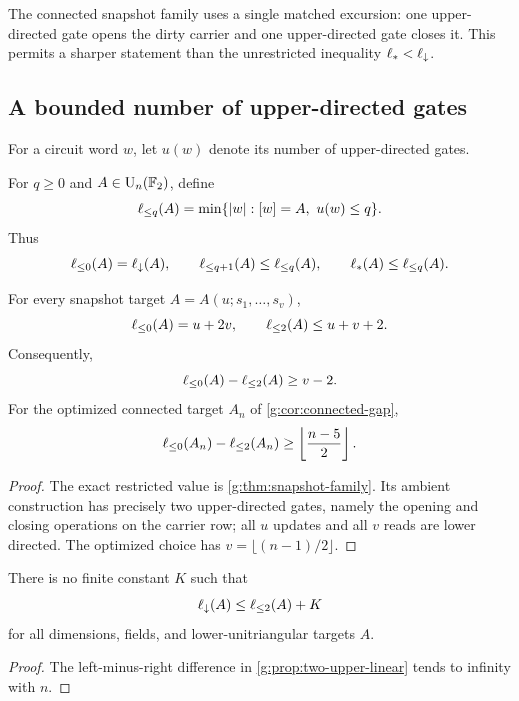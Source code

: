 The connected snapshot family uses a single matched excursion: one upper-directed gate opens the dirty carrier and one upper-directed gate closes it.  This permits a sharper statement than the unrestricted inequality $\ell_{*}<\ell_{\downarrow}$.

\subsection{A bounded number of upper-directed gates}

For a circuit word $w$, let $u(w)$ denote its number of upper-directed gates.

\begin{definition}
For $q\ge0$ and $A\in\operatorname{U}_n(\mathbb F_2)$, define
\[
\ell_{\le q}(A)
=
\min\{|w|:[w]=A,\ u(w)\le q\}.
\]
Thus
\[
\ell_{\le 0}(A)=\ell_{\downarrow}(A),
\qquad
\ell_{\le q+1}(A)\le\ell_{\le q}(A),
\qquad
\ell_{*}(A)\le\ell_{\le q}(A).
\]
\end{definition}

\begin{proposition}\label{g:prop:two-upper-linear}
For every snapshot target $A=A(u;s_1,\ldots,s_v)$,
\[
\ell_{\le 0}(A)=u+2v,
\qquad
\ell_{\le 2}(A)\le u+v+2.
\]
Consequently,
\[
\ell_{\le 0}(A)-\ell_{\le 2}(A)\ge v-2.
\]
For the optimized connected target $A_n$ of \cref{g:cor:connected-gap},
\[
\ell_{\le 0}(A_n)-\ell_{\le 2}(A_n)
\ge
\left\lfloor\frac{n-5}{2}\right\rfloor.
\]
\end{proposition}

\begin{proof}
The exact restricted value is \cref{g:thm:snapshot-family}.  Its ambient construction has precisely two upper-directed gates, namely the opening and closing operations on the carrier row; all $u$ updates and all $v$ reads are lower directed.  The optimized choice has $v=\lfloor(n-1)/2\rfloor$.
\end{proof}

\begin{corollary}\label{g:cor:no-budget-only}
There is no finite constant $K$ such that
\[
\ell_{\downarrow}(A)\le\ell_{\le 2}(A)+K
\]
for all dimensions, fields, and lower-unitriangular targets $A$.
\end{corollary}

\begin{proof}
The left-minus-right difference in \cref{g:prop:two-upper-linear} tends to infinity with $n$.
\end{proof}


